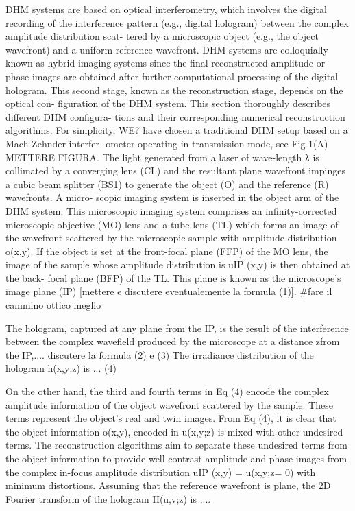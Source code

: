 DHM systems are based on optical interferometry, which involves the digital recording of the
interference pattern (e.g., digital hologram) between the complex amplitude distribution scat-
tered by a microscopic object (e.g., the object wavefront) and a uniform reference wavefront.
DHM systems are colloquially known as hybrid imaging systems since the final reconstructed
amplitude or phase images are obtained after further computational processing of the digital
hologram. This second stage, known as the reconstruction stage, depends on the optical con-
figuration of the DHM system. This section thoroughly describes different DHM configura-
tions and their corresponding numerical reconstruction algorithms.
For simplicity, WE? have chosen a traditional DHM setup based on a Mach-Zehnder interfer-
ometer operating in transmission mode, see Fig 1(A) METTERE FIGURA. The light generated from a laser of wave-length λ is collimated by a converging lens (CL) and the resultant plane wavefront impinges a
cubic beam splitter (BS1) to generate the object (O) and the reference (R) wavefronts. A micro-
scopic imaging system is inserted in the object arm of the DHM system. This microscopic
imaging system comprises an infinity-corrected microscopic objective (MO) lens and a tube
lens (TL) which forms an image of the wavefront scattered by the microscopic sample with
amplitude distribution o(x,y). If the object is set at the front-focal plane (FFP) of the MO lens,
the image of the sample whose amplitude distribution is uIP (x,y) is then obtained at the back-
focal plane (BFP) of the TL. This plane is known as the microscope’s image plane (IP) [mettere e discutere eventualemente la formula (1)]. #fare il cammino ottico meglio

The hologram, captured at any plane from the IP, is the result of the interference between
the complex wavefield produced by the microscope at a distance zfrom the IP,....
discutere la formula (2) e (3) 
 The irradiance distribution of the hologram h(x,y;z) is ... (4)

On the other hand, the third
and fourth terms in Eq (4) encode the complex amplitude information of the object wavefront
scattered by the sample. These terms represent the object’s real and twin images. From Eq (4),
it is clear that the object information o(x,y), encoded in u(x,y;z) is mixed with other undesired
terms. The reconstruction algorithms aim to separate these undesired terms from the object
information to provide well-contrast amplitude and phase images from the complex in-focus
amplitude distribution uIP (x,y) = u(x,y;z= 0) with minimum distortions. Assuming that the
reference wavefront is plane, the 2D Fourier transform of the hologram H(u,v;z) is ....